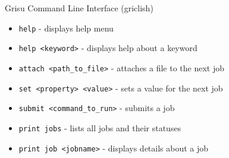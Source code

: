 \documentclass[final,t]{beamer}
\begin{document}
\begin{frame}[fragile]{}
\begin{columns}[t]
\begin{column}{.35\linewidth}
      \begin{block}{Grisu Command Line Interface (griclish)}
        \begin{itemize}
        \item \verb|help| - displays help menu
        \item \verb|help <keyword>| - displays help about a keyword
        \item \verb|attach <path_to_file>| - attaches a file to the next job
        \item \verb|set <property> <value>| - sets a value for the next job
        \item \verb|submit <command_to_run>| - submits a job
        \item \verb|print jobs| - lists all jobs and their statuses
        \item \verb|print job <jobname>| - displays details about a job
        \end{itemize}
      \end{block}
      
    \end{column}
  \end{columns}
\end{frame}
\end{document}
